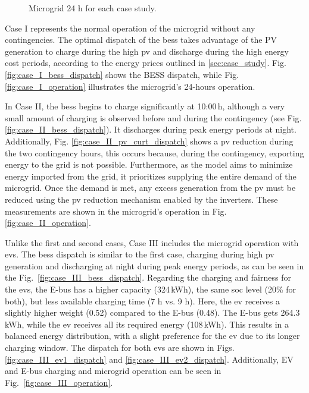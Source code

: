 \documentclass[preprint, 12pt, 3p]{elsarticle}
\begin{document}
\begin{figure}[!ht]
{        \label{fig:case_V_operation}
    }
    \caption{Microgrid 24 h for each case study.}
    \label{fig:microgrid_operation}
\end{figure}

Case I represents the normal operation of the microgrid 
without any contingencies. The optimal dispatch of the \gls{bess} takes 
advantage of the PV generation to charge during the high \gls{pv} and 
discharge during the high energy cost periods, according to the energy prices outlined in \ref{sec:case_study}.
Fig. \ref{fig:case_I_bess_dispatch} shows the BESS dispatch, while
Fig. \ref{fig:case_I_operation} illustrates the microgrid's 24-hours 
operation. 

In Case II, the \gls{bess} begins to charge significantly at  10:00\,h, although a very small amount of charging is observed before and
during the contingency (see Fig. \ref{fig:case_II_bess_dispatch}). It discharges during peak energy periods at night. 
Additionally,  Fig. \ref{fig:case_II_pv_curt_dispatch} shows a \gls{pv} 
reduction during the two contingency hours, this occurs because, during the contingency, exporting energy to the grid is 
not possible. Furthermore, as the model aims to minimize energy imported from the grid, it prioritizes supplying the entire demand of the 
microgrid. Once the demand is met, any excess generation from the 
\gls{pv} must be reduced using the \gls{pv} reduction mechanism 
enabled by the inverters. These measurements are shown in the 
microgrid's operation in Fig.\ref{fig:case_II_operation}.

Unlike the first and second cases, Case III includes the microgrid operation with \glspl{ev}. The \gls{bess} dispatch is similar to the first case, charging during high \gls{pv} generation and discharging at night during peak energy periods, as can be seen in the Fig.~\ref{fig:case_III_bess_dispatch}. Regarding the charging and fairness for the \glspl{ev}, the E-bus has a higher capacity (324\,kWh), the same \gls{soc} level (20\% for both), but less available charging time (7 h vs. 9 h). Here, the \gls{ev} receives a slightly higher weight (0.52) compared to the E-bus (0.48). The E-bus gets 264.3\,kWh, while the \gls{ev} receives all its required energy (108\,kWh). This results in a balanced energy distribution, with a slight preference for the \gls{ev} due to its longer charging window. The dispatch for both \glspl{ev} are shown in Figs. \ref{fig:case_III_ev1_dispatch} and \ref{fig:case_III_ev2_dispatch}. Additionally, EV and E-bus charging and microgrid operation can be seen in Fig.~\ref{fig:case_III_operation}.
\end{document}
